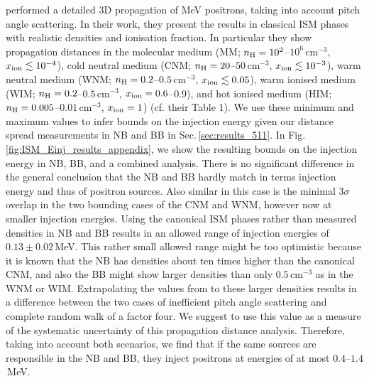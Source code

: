 \documentclass[doublespace,nopageskip]{VTthesis} %
\newcommand{\mrm}[1]{\mathrm{#1}}
\begin{document}
\citet{2009A&A...508.1099J} performed a detailed 3D propagation of MeV positrons, taking into account pitch angle scattering.
%
In their work, they present the results in classical ISM phases with realistic densities and ionisation fraction.
%
In particular they show propagation distances in the molecular medium (MM; $n_{\rm H} = 10^2$--$10^6\,\mrm{cm^{-3}}$, $x_{\rm ion} \lesssim 10^{-4}$), cold neutral medium (CNM; $n_{\rm H} = 20$--$50\,\mrm{cm^{-3}}$, $x_{\rm ion} \lesssim 10^{-3}$), warm neutral medium (WNM; $n_{\rm H} = 0.2$--$0.5\,\mrm{cm^{-3}}$, $x_{\rm ion} \lesssim 0.05$), warm ionised medium (WIM; $n_{\rm H} = 0.2$--$0.5\,\mrm{cm^{-3}}$, $x_{\rm ion} = 0.6$--$0.9$), and hot ionised medium (HIM; $n_{\rm H} = 0.005$--$0.01\,\mrm{cm^{-3}}$, $x_{\rm ion} = 1$) (cf. their Table 1).
%
We use these minimum and maximum values to infer bounds on the injection energy given our distance spread measurements in NB and BB in Sec.\,\ref{sec:results_511}.
%
In Fig.\,\ref{fig:ISM_Einj_results_appendix}, we show the resulting bounds on the injection energy in NB, BB, and a combined analysis.
%	
There is no significant difference in the general conclusion that the NB and BB hardly match in terms injection energy and thus of positron sources.
%
Also similar in this case is the minimal $3\sigma$ overlap in the two bounding cases of the CNM and WNM, however now at smaller injection energies.
%
Using the canonical ISM phases rather than measured densities in NB and BB results in an allowed range of injection energies of $0.13 \pm 0.02$\,MeV.
%
This rather small allowed range might be too optimistic because it is known that the NB has densities about ten times higher than the canonical CNM, and also the BB might show larger densities than only $0.5\,\mrm{cm^{-3}}$ as in the WNM or WIM.
%
Extrapolating the values from \citet{2009A&A...508.1099J} to these larger densities results in a difference between the two cases of inefficient pitch angle scattering and complete random walk of a factor four.
%
We suggest to use this value as a measure of the systematic uncertainty of this propagation distance analysis.
%
Therefore, taking into account both scenarios, we find that if the same sources are responsible in the NB and BB, they inject positrons at energies of at most $0.4$--$1.4$\,MeV.
\end{document}

